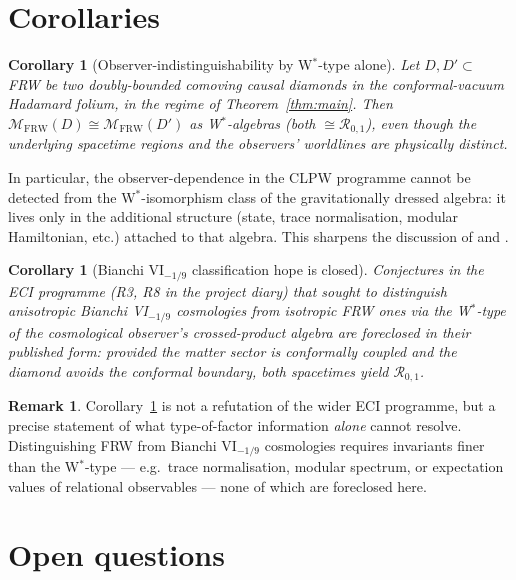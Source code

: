 \documentclass[11pt]{article}
\newtheorem{corollary}[theorem]{Corollary}
\theoremstyle{definition}
\newtheorem{remark}[theorem]{Remark}
\newcommand{\MM}{\mathcal{M}}
\newcommand{\RR}{\mathcal{R}}
\newcommand{\FRW}{\mathrm{FRW}}
\begin{document}
\section{Corollaries}\label{sec:corollaries}

\begin{corollary}[Observer-indistinguishability by W$^*$-type alone]\label{cor:obs-indis}
Let $D, D' \subset $ FRW be two doubly-bounded comoving causal diamonds in
the conformal-vacuum Hadamard folium, in the regime of
Theorem~\ref{thm:main}. Then $\MM_\FRW(D)\cong\MM_\FRW(D')$ as W$^*$-algebras
(both $\cong\RR_{0,1}$), even though the underlying spacetime regions and
the observers' worldlines are physically distinct.
\end{corollary}

In particular, the observer-dependence in the CLPW programme cannot be
detected from the W$^*$-isomorphism class of the gravitationally dressed
algebra: it lives only in the additional structure (state, trace
normalisation, modular Hamiltonian, etc.) attached to that algebra. This
sharpens the discussion of \cite[\S6]{CLPW2023} and \cite{FaulknerSperanza2024}.

\begin{corollary}[Bianchi VI$_{-1/9}$ classification hope is closed]\label{cor:bianchi}
Conjectures in the ECI programme (R3, R8 in the project diary) that
sought to distinguish anisotropic Bianchi VI$_{-1/9}$ cosmologies from
isotropic FRW ones via the W$^*$-type of the cosmological observer's
crossed-product algebra are foreclosed in their published form: provided
the matter sector is conformally coupled and the diamond avoids the
conformal boundary, both spacetimes yield $\RR_{0,1}$.
\end{corollary}

\begin{remark}\label{rmk:negative-implication}
Corollary~\ref{cor:bianchi} is not a refutation of the wider ECI programme,
but a precise statement of what type-of-factor information \emph{alone}
cannot resolve. Distinguishing FRW from Bianchi VI$_{-1/9}$ cosmologies
requires invariants finer than the W$^*$-type --- e.g.\ trace normalisation,
modular spectrum, or expectation values of relational observables ---
none of which are foreclosed here.
\end{remark}

\section{Open questions}\label{sec:open}
\end{document}
